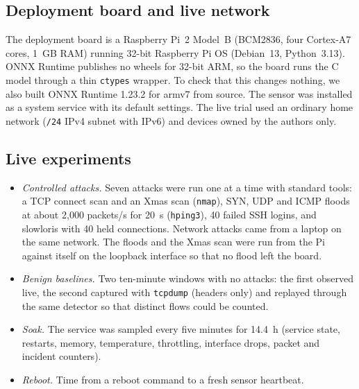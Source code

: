 \documentclass[conference]{IEEEtran}
\begin{document}
\subsection{Deployment board and live network}
The deployment board is a Raspberry Pi~2 Model~B (BCM2836, four Cortex-A7
cores, 1~GB RAM) running 32-bit Raspberry Pi OS (Debian~13, Python~3.13).
ONNX Runtime publishes no wheels for 32-bit ARM, so the board runs the C
model through a thin \texttt{ctypes} wrapper. To check that this changes
nothing, we also built ONNX Runtime 1.23.2 for armv7 from source.
The sensor was installed as a system service with its default settings.
The live trial used an ordinary home network (\texttt{/24} IPv4 subnet with
IPv6) and devices owned by the authors only.

\subsection{Live experiments}
\begin{itemize}
\item \textit{Controlled attacks.} Seven attacks were run one at a time
with standard tools: a TCP connect scan and an Xmas scan (\texttt{nmap}),
SYN, UDP and ICMP floods at about 2{,}000 packets/s for 20~s
(\texttt{hping3}), 40 failed SSH logins, and slowloris with 40 held
connections. Network attacks came from a laptop on the same network. The
floods and the Xmas scan were run from the Pi against itself on the
loopback interface so that no flood left the board.
\item \textit{Benign baselines.} Two ten-minute windows with no attacks:
the first observed live, the second captured with \texttt{tcpdump}
(headers only) and replayed through the same detector so that distinct
flows could be counted.
\item \textit{Soak.} The service was sampled every five minutes for
14.4~h (service state, restarts, memory, temperature, throttling,
interface drops, packet and incident counters).
\item \textit{Reboot.} Time from a reboot command to a fresh sensor
heartbeat.
\end{itemize}
\end{document}
